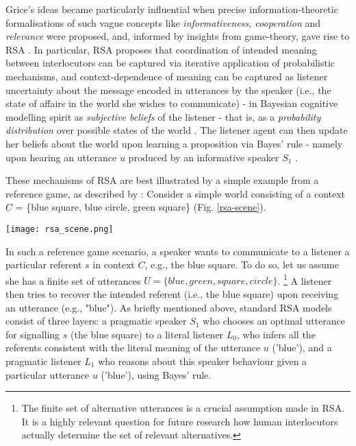 Grice’s ideas became particularly influential when precise information-theoretic formalisations of such vague concepts like \emph{informativeness, cooperation} and \emph{relevance} were proposed, and, informed by insights from game-theory, gave rise to RSA \parencite{frank2012predicting}.
In particular, RSA proposes that coordination of intended meaning between interlocutors can be captured via iterative application of probabilistic mechanisms, and context-dependence of meaning can be captured as listener uncertainty about the message encoded in utterances by the speaker (i.e., the state of affairs in the world she wishes to communicate) - in Bayesian cognitive modelling spirit as \emph{subjective beliefs} of the listener - that is, as a \emph{probability distribution} over possible states of the world \parencite{tenenbaum2011grow}. The listener agent can then update her beliefs about the world upon learning a proposition via Bayes' rule - namely upon hearing an utterance $u$ produced by an informative speaker $S_1$ \parencite{frank2012predicting}.

These mechanisms of RSA are best illustrated by a simple example from a reference game, as described by \textcite{frank2012predicting}:
Consider a simple world consisting of a context $C$ = \{blue square, blue circle, green square\} (Fig. \ref{rsa-scene}).
\begin{figure*}[t]
	\begin{center}
		\texttt{[image: rsa\_scene.png]}
	\end{center}
	\vspace{-0.3cm}
	\caption{A simple reference resolution example scenario: the context $C$ consists of three possible referents \parencite{frank2012predicting}}
	\label{rsa-scene}
\end{figure*}
In such a reference game scenario, a speaker wants to communicate to a listener a particular referent $s$ in context $C$, e.g., the blue square. To do so, let us assume she has a finite set of utterances $U = \{blue, green, square, circle\}$.  \footnote{The finite set of alternative utterances is a crucial assumption made in RSA. It is a highly relevant question for future research how human interlocutors actually determine the set of relevant alternatives.} A listener then tries to recover the intended referent (i.e., the blue square) upon receiving an utterance (e.g., "blue"). 
As briefly mentioned above, standard RSA models consist of three layers: a pragmatic speaker $S_1$ who chooses an optimal utterance for signalling $s$ (the blue square) to a literal listener $L_0$, who infers all the referents consistent with the literal meaning of the utterance $u$ ('blue'), and a pragmatic listener $L_1$ who reasons about this speaker behaviour given a particular utterance $u$ ('blue'), using Bayes' rule.

